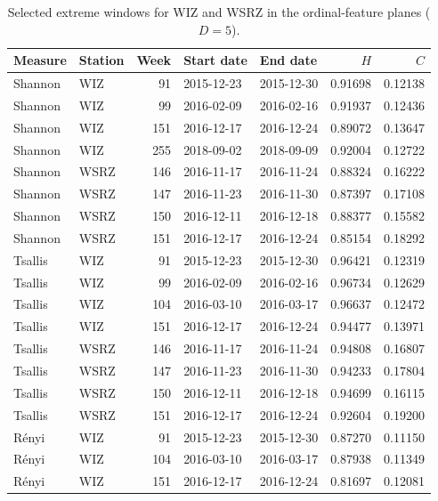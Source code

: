 \documentclass[11pt,a4paper]{article}
\begin{document}
\begin{table}[H]
	\centering
	\small
	\setlength{\tabcolsep}{4pt}
	\caption{Selected extreme windows for WIZ and WSRZ in the
		ordinal-feature planes ($D=5$).}
	\label{tab:hc_extremes_both_stations}
	\begin{tabular}{llrllrr}
		\toprule
		Measure & Station & Week & Start date & End date & $H$ & $C$ \\
		\midrule
		Shannon & WIZ & 91 & 2015-12-23 & 2015-12-30 & 0.91698 & 0.12138 \\
		Shannon & WIZ & 99 & 2016-02-09 & 2016-02-16 & 0.91937 & 0.12436 \\
		Shannon & WIZ & 151 & 2016-12-17 & 2016-12-24 & 0.89072 & 0.13647 \\
		Shannon & WIZ & 255 & 2018-09-02 & 2018-09-09 & 0.92004 & 0.12722 \\
		\addlinespace[2pt]
		Shannon & WSRZ & 146 & 2016-11-17 & 2016-11-24 & 0.88324 & 0.16222 \\
		Shannon & WSRZ & 147 & 2016-11-23 & 2016-11-30 & 0.87397 & 0.17108 \\
		Shannon & WSRZ & 150 & 2016-12-11 & 2016-12-18 & 0.88377 & 0.15582 \\
		Shannon & WSRZ & 151 & 2016-12-17 & 2016-12-24 & 0.85154 & 0.18292 \\
		\midrule
		Tsallis & WIZ & 91 & 2015-12-23 & 2015-12-30 & 0.96421 & 0.12319 \\
		Tsallis & WIZ & 99 & 2016-02-09 & 2016-02-16 & 0.96734 & 0.12629 \\
		Tsallis & WIZ & 104 & 2016-03-10 & 2016-03-17 & 0.96637 & 0.12472 \\
		Tsallis & WIZ & 151 & 2016-12-17 & 2016-12-24 & 0.94477 & 0.13971 \\
		\addlinespace[2pt]
		Tsallis & WSRZ & 146 & 2016-11-17 & 2016-11-24 & 0.94808 & 0.16807 \\
		Tsallis & WSRZ & 147 & 2016-11-23 & 2016-11-30 & 0.94233 & 0.17804 \\
		Tsallis & WSRZ & 150 & 2016-12-11 & 2016-12-18 & 0.94699 & 0.16115 \\
		Tsallis & WSRZ & 151 & 2016-12-17 & 2016-12-24 & 0.92604 & 0.19200 \\
		\midrule
		R\'enyi & WIZ & 91 & 2015-12-23 & 2015-12-30 & 0.87270 & 0.11150 \\
		R\'enyi & WIZ & 104 & 2016-03-10 & 2016-03-17 & 0.87938 & 0.11349 \\
		R\'enyi & WIZ & 151 & 2016-12-17 & 2016-12-24 & 0.81697 & 0.12081 \\

\end{tabular}
\end{table}
\end{document}
